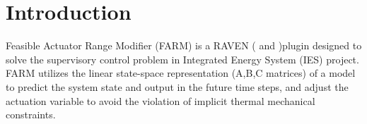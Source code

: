 



\section{Introduction}
\label{sec:Introduction}
Feasible Actuator Range Modifier (FARM) is a RAVEN (\cite{RAVEN} and \cite{RAVENtheoryMan})plugin designed to solve the 
supervisory control problem in Integrated Energy System (IES) project. FARM utilizes the linear state-space representation 
(A,B,C matrices) of a model to predict the system state and output in the future time steps, and adjust the actuation variable 
to avoid the violation of implicit thermal mechanical constraints.

